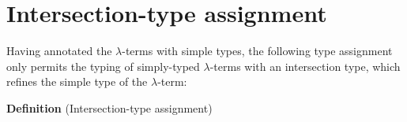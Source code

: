 \documentclass[a4paper, 12pt, twoside]{style/ociamthesis}
\theoremstyle{plain}
\theoremstyle{definition}
\theoremstyle{remark}
\newcommand{\concat}{\ensuremath{+\!\!\!\!+\,}}
\newcommand{\tocap}{\leadsto\kern-.5ex\cap}
\begin{document}

\section{Intersection-type
assignment}\label{intersection-type-assignment}

Having annotated the \(\lambda\)-terms with simple types, the following
type assignment only permits the typing of simply-typed
\(\lambda\)-terms with an intersection type, which refines the simple
type of the \(\lambda\)-term:

\textbf{Definition} (Intersection-type assignment)
\end{document}
